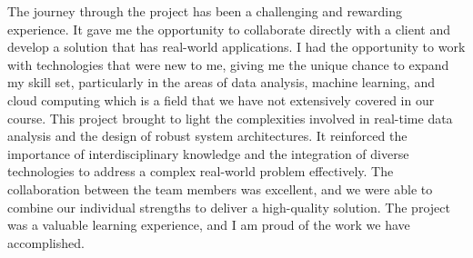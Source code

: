 The journey through the project has been a challenging and rewarding experience. It gave me the opportunity to collaborate directly with a client and develop 
a solution that has real-world applications. I had the opportunity to work with technologies that were new to me, giving me the unique chance to expand my skill 
set, particularly in the areas of data analysis, machine learning, and cloud computing which is a field that we have not extensively covered in our course.  
This project brought to light the complexities involved in real-time data analysis and the design of robust system architectures. It reinforced the
importance of interdisciplinary knowledge and the integration of diverse technologies to address a complex real-world problem effectively. 
The collaboration between the team members was excellent, and we were able to combine our individual strengths to deliver a high-quality solution. 
The project was a valuable learning experience, and I am proud of the work we have accomplished.

